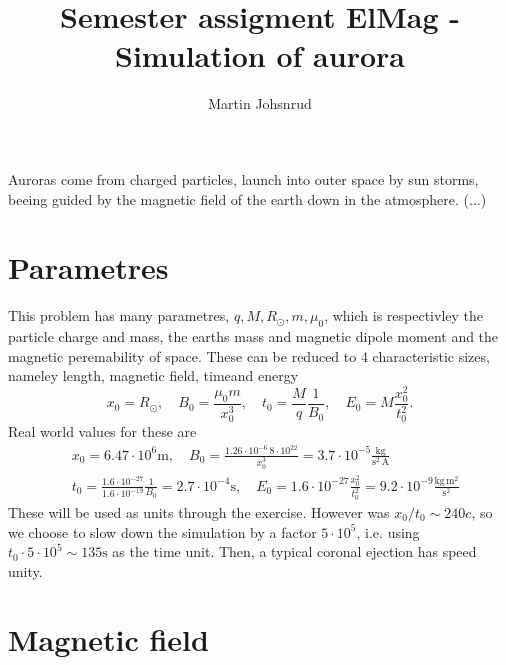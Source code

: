 \documentclass{article}
\title{Semester assigment ElMag - Simulation of aurora}
\author{Martin Johsnrud}
\begin{document}
    \maketitle

    Auroras come from charged particles, launch into outer space by sun storms, beeing guided by the magnetic field of the earth down in the atmosphere. (...) 
    
    \section*{Parametres}
        This problem has many parametres, $q, M, R_{\odot}, m, \mu_0$, which is respectivley the particle charge and mass, the earths mass and magnetic dipole moment and the magnetic peremability of space. These can be reduced to 4 characteristic sizes, nameley length, magnetic field, timeand energy
        \begin{equation*}
            x_0 = R_{\odot}, \quad  B_0 = \frac{\mu_0 m}{x_0^3}, \quad t_0 = \frac{M}{q}\frac{1}{B_0},  \quad E_0 = M\frac{ x_0^2}{t_0^2}.
        \end{equation*}
        Real world values for these are  
        \begin{align*}
            & x_0 = 6.47 \cdot 10^6 \textrm{m}, \quad
            B_0 = \frac{1.26 \cdot 10^{-6} \, 8 \cdot 10^{22}}{x_0^3} = 3.7 \cdot 10^{-5} \frac{\textrm{kg}}{\textrm{s}^{2} \, \textrm{A}} \\
            &t_0 = \frac{1.6 \cdot 10^{-27}}{1.6\cdot10^{-19}}\frac{1}{B_0} = 2.7 \cdot 10^{-4} \textrm{s}, \quad 
            E_0 = 1.6 \cdot 10^{-27} \frac{x_0^2}{t_0^2} = 9.2 \cdot 10^{-9} \frac{\textrm{kg} \, \textrm{m}^2}{\textrm{s}^2}
        \end{align*}
        These will be used as units through the exercise. However was $x_0 / t_0 \sim 240 c$, so we choose to slow down the simulation by a factor $ 5\cdot 10^5$, i.e. using $t_0 \cdot 5\cdot 10^5 \sim 135 \textrm{s}$ as the time unit. Then, a typical coronal ejection has speed unity.

    \section*{Magnetic field}
\end{document}

